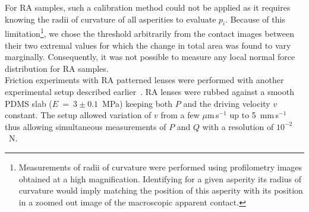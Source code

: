 \documentclass[pre,groupedaddress,showkeys,showpacs,twocolumn]{revtex4}
\begin{document}
For RA samples, such a calibration method could not be applied as it requires knowing the radii of curvature of all asperities to evaluate $p_i$. Because of this limitation\footnote{Measurements of radii of curvature were performed using profilometry images obtained at a high magnification. Identifying for a given asperity its radius of curvature would imply matching the position of this asperity with its position in a zoomed out image of the macroscopic apparent contact.}, we chose the threshold arbitrarily from the contact images between their two extremal values for which the change in total area was found to vary marginally. Consequently, it was not possible to measure any local normal force distribution for RA samples.\\
%
\indent Friction experiments with RA patterned lenses were performed with another experimental setup described earlier~\cite{piccardo2013}. RA lenses were rubbed against a smooth PDMS slab ($E~=~3\pm0.1$~MPa) keeping both $P$ and the driving velocity $v$ constant. The setup allowed variation of $v$ from a few $\mu$m\,s$^{-1}$ up to 5~mm\,s$^{-1}$ thus allowing simultaneous measurements of $P$ and $Q$ with a resolution of $10^{-2}$~N. 
%
\end{document}
